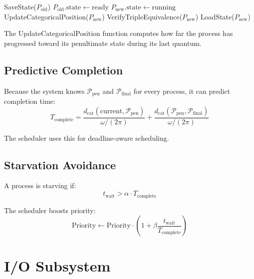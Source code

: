 \documentclass[twocolumn,10pt]{article}
\theoremstyle{definition}
\theoremstyle{remark}
\newcommand{\pentstate}{\mathcal{P}_{\text{pen}}}
\newcommand{\finalstate}{\mathcal{P}_{\text{final}}}
\newcommand{\dcat}{d_{\text{cat}}}
\begin{document}
\begin{algorithm}
\caption{Context Switch}
\begin{algorithmic}[1]
    \State SaveState($P_{\text{old}}$)
    \State $P_{\text{old}}.\text{state} \gets \text{ready}$
    \State $P_{\text{new}}.\text{state} \gets \text{running}$
    \State UpdateCategoricalPosition($P_{\text{new}}$)
    \State VerifyTripleEquivalence($P_{\text{new}}$)
    \State LoadState($P_{\text{new}}$)
\EndFunction
\end{algorithmic}
\end{algorithm}

The UpdateCategoricalPosition function computes how far the process has progressed toward its penultimate state during its last quantum.

\subsection{Predictive Completion}

Because the system knows $\pentstate$ and $\finalstate$ for every process, it can predict completion time:
\begin{equation}
    T_{\text{complete}} = \frac{\dcat(\text{current}, \pentstate)}{\omega / (2\pi)} + \frac{\dcat(\pentstate, \finalstate)}{\omega / (2\pi)}
\end{equation}

The scheduler uses this for deadline-aware scheduling.

\subsection{Starvation Avoidance}

A process is starving if:
\begin{equation}
    t_{\text{wait}} > \alpha \cdot T_{\text{complete}}
\end{equation}

The scheduler boosts priority:
\begin{equation}
    \text{Priority} \gets \text{Priority} \cdot \left(1 + \beta \frac{t_{\text{wait}}}{T_{\text{complete}}}\right)
\end{equation}

\section{I/O Subsystem}
\label{sec:io}
\end{document}
